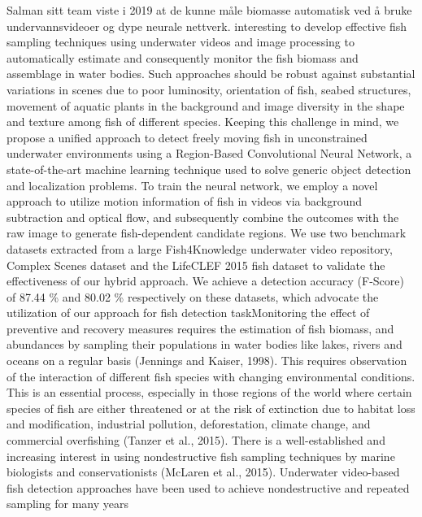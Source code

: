 Salman sitt team viste i 2019 at de kunne måle biomasse automatisk ved å bruke undervannsvideoer og dype neurale nettverk.  interesting to develop effective ﬁsh sampling techniques using underwater videos and image processing to automatically estimate and consequently monitor the ﬁsh biomass and assemblage in water bodies. Such approaches should be robust against substantial variations in scenes due to poor luminosity, orientation of ﬁsh, seabed structures, movement of aquatic plants in the background and image diversity in the shape and texture among ﬁsh of different species. Keeping this challenge in mind, we propose a uniﬁed approach to detect freely moving ﬁsh in unconstrained underwater environments using a Region-Based Convolutional Neural Network, a state-of-the-art machine learning technique used to solve generic object detection and localization problems. To train the neural network, we employ a novel approach to utilize motion information of ﬁsh in videos via background subtraction and optical ﬂow, and subsequently combine the outcomes with the raw image to generate ﬁsh-dependent candidate regions. We use two benchmark datasets extracted from a large Fish4Knowledge underwater video repository, Complex Scenes dataset and the LifeCLEF 2015 ﬁsh dataset to validate the effectiveness of our hybrid approach. We achieve a detection accuracy (F-Score) of 87.44 \% and 80.02 \% respectively on these datasets, which advocate the utilization of our approach for ﬁsh detection taskMonitoring the effect of preventive and recovery measures requires the estimation of ﬁsh biomass, and abundances by sampling their populations in water bodies like lakes, rivers and oceans on a regular basis (Jennings and Kaiser, 1998). This requires observation of the interaction of different ﬁsh species with changing environmental conditions. This is an essential process, especially in those regions of the world where certain species of ﬁsh are either threatened or at the risk of extinction due to habitat loss and modiﬁcation, industrial pollution, deforestation, climate change, and commercial overﬁshing (Tanzer et al., 2015). There is a well-established and increasing interest in using nondestructive ﬁsh sampling techniques by marine biologists and conservationists (McLaren et al., 2015). Underwater video-based ﬁsh detection approaches have been used to achieve nondestructive and repeated sampling for many years \cite{Salman m.fl. 2019}


